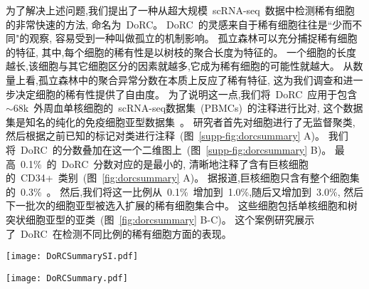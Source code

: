 为了解决上述问题,我们提出了一种从超大规模~scRNA-seq~数据中检测稀有细胞的非常快速的方法,
命名为~DoRC。
DoRC~的灵感来自于稀有细胞往往是``少而不同"的观察, 容易受到一种叫做孤立的机制影响。
孤立森林可以充分捕捉稀有细胞的特征,
其中,每个细胞的稀有性是以树枝的聚合长度为特征的。
一个细胞的长度越长,该细胞与其它细胞区分的因素就越多,它成为稀有细胞的可能性就越大。
从数量上看,孤立森林中的聚合异常分数在本质上反应了稀有特征,
这为我们调查和进一步决定细胞的稀有性提供了自由度。
为了说明这一点,我们将~DoRC~应用于包含~${\sim}68$k~外周血单核细胞的~scRNA-seq数据集~(PBMCs)~的注释进行比对,
这个数据集是知名的纯化的免疫细胞亚型数据集~\cite{zheng2017massively}。
研究者首先对细胞进行了无监督聚类,
然后根据之前已知的标记对类进行注释~(图~\ref{supp-fig:dorcsummary} A)。
我们将~DoRC~的分数叠加在这一个二维图上~(图~\ref{supp-fig:dorcsummary} B)。
最高~0.1\%~的~DoRC~分数对应的是最小的, 
清晰地注释了含有巨核细胞的~CD34+~类别~(图~\ref{fig:dorcsummary} A)。
据报道,巨核细胞只含有整个细胞集的~0.3\%~\cite{zheng2017massively}。
然后,我们将这一比例从~0.1\%~增加到~1.0\%,随后又增加到~3.0\%,
然后下一批次的细胞亚型被选入扩展的稀有细胞集合中。
这些细胞包括单核细胞和树突状细胞亚型的亚类~(图~\ref{fig:dorcsummary} B-C)。
这个案例研究展示了~DoRC~在检测不同比例的稀有细胞方面的表现。

\begin{figure*}[!htbp]
    \centering
    \texttt{[image: DoRCSummarySI.pdf]}
    \caption{
    DoRC在~PBMCs\_68k~上的性能评估。
    (A)~基于~t-SNE~的二维嵌入数据集可视化图,按~Zheng~等所报道的鉴定的不同类别用不同的颜色标记。
    (B)~PBMCs\_68k~上细胞的~DoRC~得分热图。巨核细胞群~(0.3\%),是所有细胞类型中最稀有的细胞,获得了最高的~DoRC~分数。
    (C)~使用~IQR-阈值标准的~DoRC~识别的稀有细胞。
    }
    \label{supp-fig:dorcsummary}
\end{figure*}

\begin{figure*}[!htbp]
    \centering
    \texttt{[image: DoRCSummary.pdf]}
    \caption{
    DoRC发现了不同稀有度的细胞。在~${\sim}68$k~PBMC~数据~\cite{zheng2017massively}~中,不同级别的稀有度对应了一个数量不断增加的稀有细胞群。
    (A-C)~根据~DoRC~得分选出的前~0.1\%、1.0\%~和~3.0\%~的细胞分别以高亮显示。    
    }
    \label{fig:dorcsummary}
\end{figure*}

